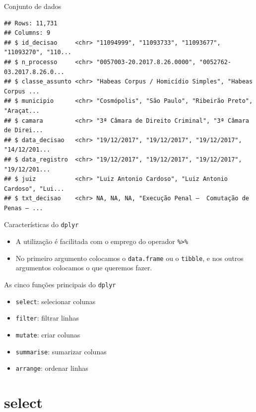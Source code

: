 \documentclass[
  10pt,
  ignorenonframetext,
]{beamer}
\begin{document}
\begin{frame}[fragile]{Conjunto de dados}
\begin{verbatim}
## Rows: 11,731
## Columns: 9
## $ id_decisao     <chr> "11094999", "11093733", "11093677", "11093270", "110...
## $ n_processo     <chr> "0057003-20.2017.8.26.0000", "0052762-03.2017.8.26.0...
## $ classe_assunto <chr> "Habeas Corpus / Homicídio Simples", "Habeas Corpus ...
## $ municipio      <chr> "Cosmópolis", "São Paulo", "Ribeirão Preto", "Araçat...
## $ camara         <chr> "3ª Câmara de Direito Criminal", "3ª Câmara de Direi...
## $ data_decisao   <chr> "19/12/2017", "19/12/2017", "19/12/2017", "14/12/201...
## $ data_registro  <chr> "19/12/2017", "19/12/2017", "19/12/2017", "19/12/201...
## $ juiz           <chr> "Luiz Antonio Cardoso", "Luiz Antonio Cardoso", "Lui...
## $ txt_decisao    <chr> NA, NA, NA, "Execução Penal –  Comutação de Penas – ...
\end{verbatim}
\end{frame}

\begin{frame}[fragile]{Características do \texttt{dplyr}}
\protect\hypertarget{caracteruxedsticas-do-dplyr}{}
\begin{itemize}
\item
  A utilização é facilitada com o emprego do operador
  \texttt{\%\textgreater{}\%}
\item
  No primeiro argumento colocamos o \texttt{data.frame} ou o
  \texttt{tibble}, e nos outros argumentos colocamos o que queremos
  fazer.
\end{itemize}
\end{frame}

\begin{frame}[fragile]{As cinco funções principais do \texttt{dplyr}}
\protect\hypertarget{as-cinco-funuxe7uxf5es-principais-do-dplyr}{}
\begin{itemize}
\item
  \texttt{select}: selecionar colunas
\item
  \texttt{filter}: filtrar linhas
\item
  \texttt{mutate}: criar colunas
\item
  \texttt{summarise}: sumarizar colunas
\item
  \texttt{arrange}: ordenar linhas
\end{itemize}
\end{frame}

\hypertarget{select}{%
\section{select}\label{select}}
\end{document}
